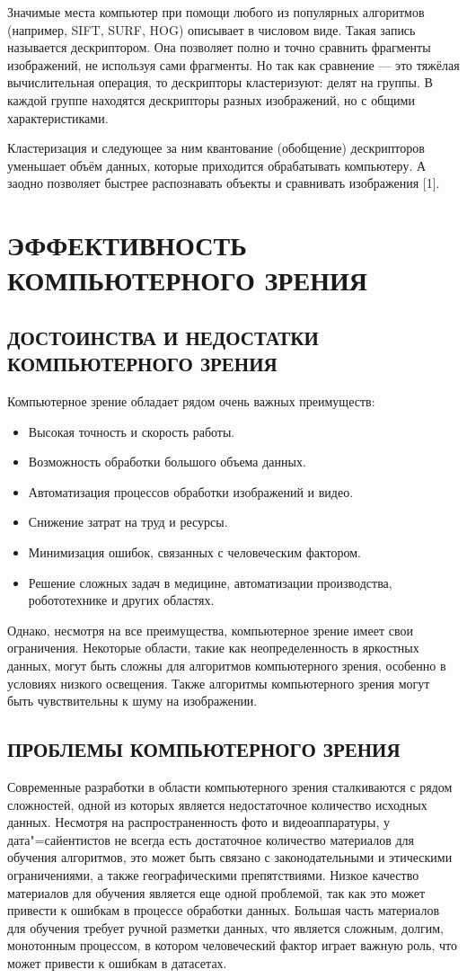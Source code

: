 \documentclass[bachelor, och, referat, times]{SCWorks}
\begin{document}
Значимые места компьютер при помощи любого из популярных алгоритмов (например, SIFT, SURF, HOG) описывает в числовом виде. Такая запись называется дескриптором. Она позволяет полно и точно сравнить фрагменты изображений, не используя сами фрагменты. Но так как сравнение — это тяжёлая вычислительная операция, то дескрипторы кластеризуют: делят на группы. В каждой группе находятся дескрипторы разных изображений, но с общими характеристиками.

Кластеризация и следующее за ним квантование (обобщение) дескрипторов уменьшает объём данных, которые приходится обрабатывать компьютеру. А заодно позволяет быстрее распознавать объекты и сравнивать изображения [1].

\section{ЭФФЕКТИВНОСТЬ КОМПЬЮТЕРНОГО ЗРЕНИЯ}
\subsection{ДОСТОИНСТВА И НЕДОСТАТКИ КОМПЬЮТЕРНОГО ЗРЕНИЯ}
Компьютерное зрение обладает рядом очень важных преимуществ: 
\begin{itemize}
\item Высокая точность и скорость работы. 
\item Возможность обработки большого объема данных. 
\item Автоматизация процессов обработки изображений и видео. 
\item Снижение затрат на труд и ресурсы. 
\item Минимизация ошибок, связанных с человеческим фактором. 
\item Решение сложных задач в медицине, автоматизации производства,   робототехнике и других областях. 
\end{itemize}

Однако, несмотря на все преимущества, компьютерное зрение имеет свои ограничения. Некоторые области, такие как неопределенность в яркостных данных, могут быть сложны для алгоритмов компьютерного зрения, особенно в условиях низкого освещения. Также алгоритмы компьютерного зрения могут быть чувствительны к шуму на изображении. 

\subsection{ПРОБЛЕМЫ КОМПЬЮТЕРНОГО ЗРЕНИЯ}
Современные разработки в области компьютерного зрения сталкиваются с рядом сложностей, одной из которых является недостаточное количество исходных данных. Несмотря на распространенность фото и видеоаппаратуры, у дата"=сайентистов не всегда есть достаточное количество материалов для обучения алгоритмов, это может быть связано с законодательными и этическими ограничениями, а также географическими препятствиями. Низкое качество материалов для обучения является еще одной проблемой, так как это может привести к ошибкам в процессе обработки данных. Большая часть материалов для обучения требует ручной разметки данных, что является сложным, долгим, монотонным процессом, в котором человеческий фактор играет важную роль, что может привести к ошибкам в датасетах. 
\end{document}
